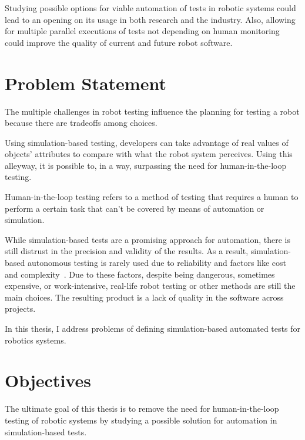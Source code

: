 Studying possible options for viable automation of tests in robotic systems could lead to an opening on its usage in both research and the industry. Also, allowing for multiple parallel executions of tests not depending on human monitoring could improve the quality of current and future robot software.


\section{Problem Statement}
\label{sec:problem}

The multiple challenges in robot testing influence the planning for testing a robot because there are tradeoffs among choices.

Using simulation-based testing, developers can take advantage of real values of objects' attributes to compare with what the robot system perceives. Using this alleyway, it is possible to, in a way, surpassing the need for human-in-the-loop testing.

Human-in-the-loop testing refers to a method of testing that requires a human to perform a certain task that can't be covered by means of automation or simulation.
 
While simulation-based tests are a promising approach for automation, there is still distrust in the precision and validity of the results. As a result, simulation-based autonomous testing is rarely used due to reliability and factors like cost and complexity~\cite{9240632,zizyte2021importance}.
Due to these factors, despite being dangerous, sometimes expensive, or work-intensive, real-life robot testing or other methods are still the main choices. The resulting product is a lack of quality in the software across projects.

In this thesis, I address problems of defining simulation-based automated tests for robotics systems.


\section{Objectives}
\label{sec:objectives}

The ultimate goal of this thesis is to remove the need for human-in-the-loop testing of robotic systems by studying a possible solution for automation in simulation-based tests.

